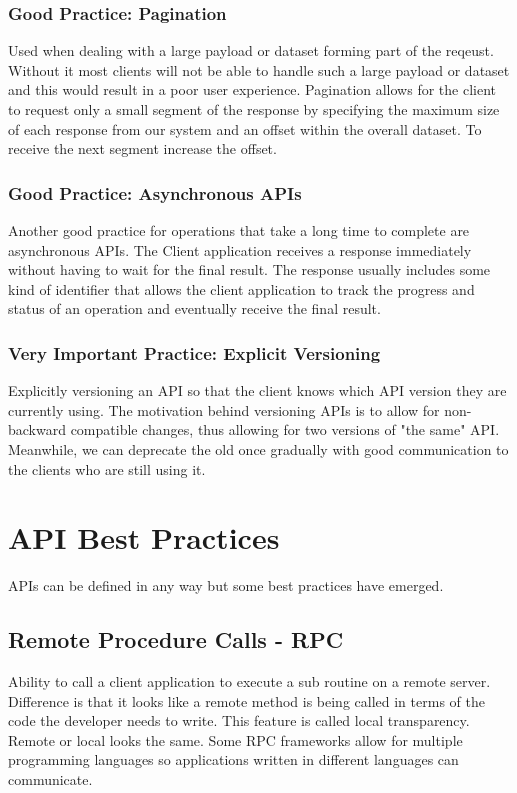 \subsubsection{Good Practice: Pagination}
Used when dealing with a large payload or dataset forming part of the reqeust.
Without it most clients will not be able to handle such a large payload or dataset and this would result in a poor user experience.
Pagination allows for the client to request only a small segment of the response by specifying the maximum size of each response from our system
and an offset within the overall dataset.
To receive the next segment increase the offset.

\subsubsection{Good Practice: Asynchronous APIs}
Another good practice for operations that take a long time to complete are asynchronous APIs.
The Client application receives a response immediately without having to wait for the final result.
The response usually includes some kind of identifier that allows the client application to track the progress
and status of an operation and eventually receive the final result.

\subsubsection{Very Important Practice: Explicit Versioning}
Explicitly versioning an API so that the client knows which API version they are currently using.
The motivation behind versioning APIs is to allow for non-backward compatible changes, thus allowing for two versions of "the same" API\@.
Meanwhile, we can deprecate the old once gradually with good communication to the clients who are still using it.


\section{API Best Practices}
APIs can be defined in any way but some best practices have emerged.

\subsection{Remote Procedure Calls - RPC}
Ability to call a client application to execute a sub routine on a remote server.
Difference is that it looks like a remote method is being called in terms of the code the developer needs to write.
This feature is called local transparency.
Remote or local looks the same.
Some RPC frameworks allow for multiple programming languages so applications written in different languages can communicate.

